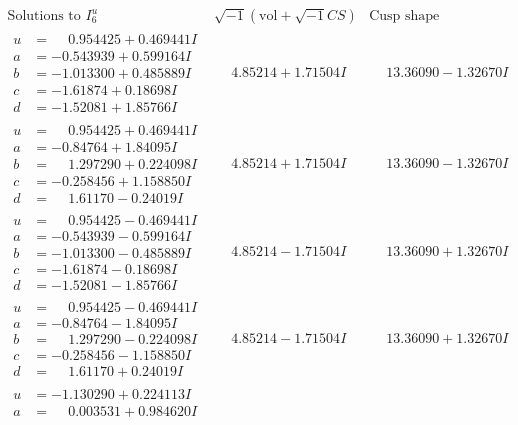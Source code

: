\documentclass[1p]{elsarticle_modified}
\theoremstyle{definition}
\newcommand{\I}{\sqrt{-1}}
\begin{document}
$$\begin{array}{c|c|c}  
\text{Solutions to }I^u_{6}& \I (\text{vol} + \sqrt{-1}CS) & \text{Cusp shape}\\
 \hline 
\begin{aligned}
u &= \phantom{-}0.954425 + 0.469441 I \\
a &= -0.543939 + 0.599164 I \\
b &= -1.013300 + 0.485889 I \\
c &= -1.61874 + 0.18698 I \\
d &= -1.52081 + 1.85766 I\end{aligned}
 & \phantom{-}4.85214 + 1.71504 I & \phantom{-}13.36090 - 1.32670 I \\ \hline\begin{aligned}
u &= \phantom{-}0.954425 + 0.469441 I \\
a &= -0.84764 + 1.84095 I \\
b &= \phantom{-}1.297290 + 0.224098 I \\
c &= -0.258456 + 1.158850 I \\
d &= \phantom{-}1.61170 - 0.24019 I\end{aligned}
 & \phantom{-}4.85214 + 1.71504 I & \phantom{-}13.36090 - 1.32670 I \\ \hline\begin{aligned}
u &= \phantom{-}0.954425 - 0.469441 I \\
a &= -0.543939 - 0.599164 I \\
b &= -1.013300 - 0.485889 I \\
c &= -1.61874 - 0.18698 I \\
d &= -1.52081 - 1.85766 I\end{aligned}
 & \phantom{-}4.85214 - 1.71504 I & \phantom{-}13.36090 + 1.32670 I \\ \hline\begin{aligned}
u &= \phantom{-}0.954425 - 0.469441 I \\
a &= -0.84764 - 1.84095 I \\
b &= \phantom{-}1.297290 - 0.224098 I \\
c &= -0.258456 - 1.158850 I \\
d &= \phantom{-}1.61170 + 0.24019 I\end{aligned}
 & \phantom{-}4.85214 - 1.71504 I & \phantom{-}13.36090 + 1.32670 I \\ \hline\begin{aligned}
u &= -1.130290 + 0.224113 I \\
a &= \phantom{-}0.003531 + 0.984620 I \\

\end{aligned}
\end{array}$$
\end{document}
